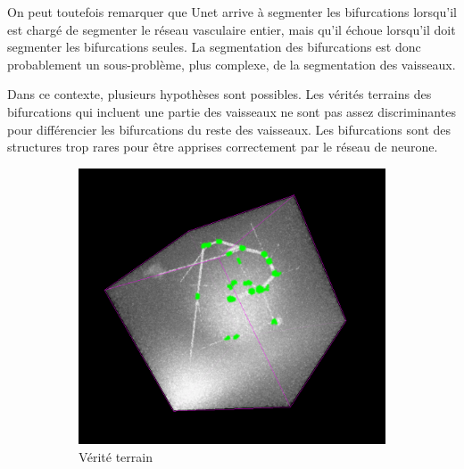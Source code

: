 On peut toutefois remarquer que Unet arrive à segmenter les bifurcations lorsqu'il est chargé de segmenter le réseau vasculaire entier, mais qu'il échoue lorsqu'il doit segmenter les bifurcations seules. La segmentation des bifurcations est donc probablement un sous-problème, plus complexe, de la segmentation des vaisseaux. 

Dans ce contexte, plusieurs hypothèses sont possibles. Les vérités terrains des bifurcations qui incluent une partie des vaisseaux ne sont pas assez discriminantes pour différencier les bifurcations du reste des vaisseaux. Les bifurcations sont des structures trop rares pour être apprises correctement par le réseau de neurone.

\begin{figure}[!ht]
    \centering
    \begin{subfigure}{0.45\textwidth}
        \includegraphics[width=\textwidth]{Images/exp_seg_gt.png}
        \caption{Vérité terrain}
    \end{subfigure}
    \begin{subfigure}{0.45\textwidth}

\end{subfigure}
\end{figure}
